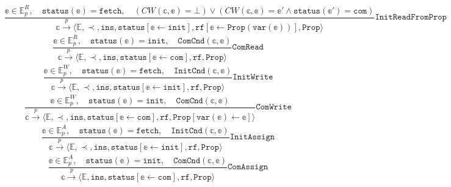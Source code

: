 \documentclass{article}
\begin{document}
$$\frac{\mathbb{e} \in \mathbb{E}_p^R, \hspace{1em} \texttt{status}(\mathbb{e}) = \texttt{fetch}, \hspace{1em} (CW(\mathbb{c},\mathbb{e}) = \bot) \vee (CW(\mathbb{c},\mathbb{e}) = \mathbb{e}' \wedge \texttt{status}(\mathbb{e}') = \texttt{com})}{\mathbb{c} \xrightarrow[]{p} \langle \mathbb{E},\prec,\texttt{ins}, \texttt{status}[\mathbb{e} \leftarrow \texttt{init}], \texttt{rf}[\mathbb{e} \leftarrow \texttt{Prop}(\texttt{var}(\mathbb{e}))], \texttt{Prop} \rangle} \texttt{InitReadFromProp}$$
$$\frac{\mathbb{e} \in \mathbb{E}_p^R, \hspace{1em} \texttt{status}(\mathbb{e}) = \texttt{init}, \hspace{1em} \texttt{ComCnd}(\mathbb{c},\mathbb{e}) }{\mathbb{c} \xrightarrow[]{p} \langle \mathbb{E}, \prec, \texttt{ins}, \texttt{status}[\mathbb{e} \leftarrow \texttt{com}], \texttt{rf}, \texttt{Prop}\rangle}\texttt{ComRead} $$
$$\frac{\mathbb{e} \in \mathbb{E}_p^W, \hspace{1em} \texttt{status} (\mathbb{e}) = \texttt{fetch}, \hspace{1em} \texttt{InitCnd}(\mathbb{c},\mathbb{e})}{\mathbb{c} \xrightarrow[]{p} \langle \mathbb{E}, \prec, \texttt{ins}, \texttt{status}[\mathbb{e} \leftarrow \texttt{init}], \texttt{rf}, \texttt{Prop}\rangle} \texttt{InitWrite} $$
$$\frac{\mathbb{e} \in \mathbb{E}_p^W, \hspace{1em} \texttt{status}(\mathbb{e}) = \texttt{init}, \hspace{1em} \texttt{ComCnd}(\mathbb{c},\mathbb{e})}{\mathbb{c} \xrightarrow[]{p} \langle \mathbb{E}, \prec, \texttt{ins}, \texttt{status}[\mathbb{e} \leftarrow \texttt{com}], \texttt{rf}, \texttt{Prop}[\texttt{var}(\mathbb{e}) \leftarrow \mathbb{e}]\rangle} \texttt{ComWrite}$$
$$\frac{\mathbb{e} \in \mathbb{E}_p^A,\hspace{1em} \texttt{status}(\mathbb{e}) = \texttt{fetch}, \hspace{1em} \texttt{InitCnd}(\mathbb{c},\mathbb{e})}{\mathbb{c} \xrightarrow[]{p} \langle\mathbb{E}, \prec, \texttt{ins}, \texttt{status}[\mathbb{e} \leftarrow \texttt{init}], \texttt{rf}, \texttt{Prop}\rangle} \texttt{InitAssign}$$
$$\frac{\mathbb{e} \in \mathbb{E}_p^A, \hspace{1em} \texttt{status}(\mathbb{e}) = \texttt{init}, \hspace{1em} \texttt{ComCnd}(\mathbb{c},\mathbb{e})}{\mathbb{c} \xrightarrow[]{p} \langle \mathbb{E}, \texttt{ins}, \texttt{status}[\mathbb{e} \leftarrow \texttt{com}], \texttt{rf}, \texttt{Prop}\rangle} \texttt{ComAssign} $$
\end{document}
